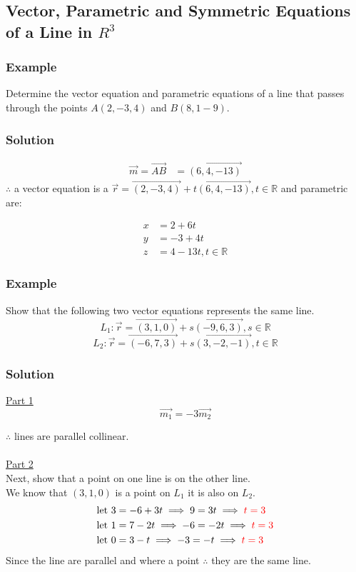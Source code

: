 \documentclass{article}
\begin{document}
\subsection{Vector, Parametric and Symmetric Equations of a Line in $R^3$}
\subsubsection*{Example}
Determine the vector equation and parametric equations of a line that passes through the points $A(2,-3,4)$ and $B(8,1-9)$.
\subsubsection*{Solution}
\begin{align*}
\vec{m}=\overrightarrow{AB}&=\overrightarrow{(6,4,-13)}
\end{align*}
$\therefore$ a vector equation is a $\vec{r}=\overrightarrow{(2,-3,4)}+t\overrightarrow{(6,4,-13)}, t \in \mathbb{R}$ and parametric are:

\begin{align*}
    x&=2+6t\\
    y&=-3+4t\\
    z&=4-13t, t \in \mathbb{R}
\end{align*}

\subsubsection*{Example}
Show that the following two vector equations represents the same line.
\[
    L_1: \vec{r}=\overrightarrow{(3,1,0)}+s\overrightarrow{(-9,6,3)}, s \in \mathbb{R}
\]
\[
 L_2: \vec{r}=\overrightarrow{(-6,7,3)}+s\overrightarrow{(3,-2,-1)}, t \in \mathbb{R}
\]
\subsubsection*{Solution}
\underline{Part 1}
\[
\overrightarrow{m_1}=-3\overrightarrow{m_2}
\]

$\therefore$ lines are parallel collinear.\\\\
\underline{Part 2}\\
Next, show that a point on one line is on the other line.\\
We know that $(3,1,0)$ is a point on $L_1$ it is also on $L_2$.
\begin{align*}
    \text{let } 3&=-6+3t \implies 9=3t \implies \textcolor{red}{t=3}\\
    \text{let } 1&=7-2t \implies -6 =-2t \implies \textcolor{red}{t=3}\\
    \text{let } 0&=3-t \implies -3=-t \implies \textcolor{red}{t=3}
\end{align*}
Since the line are parallel and where a point $\therefore$ they are the same line.
\end{document}
